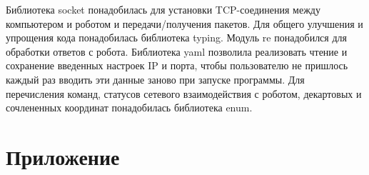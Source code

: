 \documentclass[a4paper,14pt]{extarticle}
\begin{document}
Библиотека socket понадобилась для установки TCP-соединения между компьютером и роботом
и передачи/получения пакетов. Для общего улучшения и упрощения кода понадобилась
библиотека typing. Модуль re понадобился для обработки ответов с робота. Библиотека
yaml позволила реализовать чтение и сохранение введенных настроек IP и порта, чтобы
пользователю не пришлось каждый раз вводить эти данные заново при запуске программы.
Для перечисления команд, статусов сетевого взаимодействия с роботом,
декартовых и сочлененных координат понадобилась библиотека enum.





\appendix
\renewcommand{\thesection}{\Asbuk{section}}

\section{Приложение}

\end{document}
